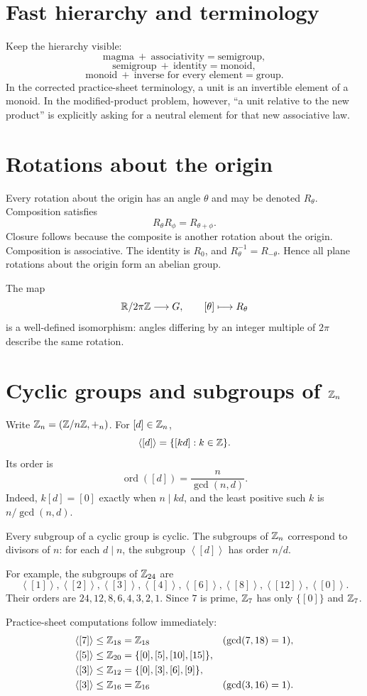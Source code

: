 \documentclass[11pt,openany]{book}
\newcommand{\angles}[1]{\left\langle#1\right\rangle}
\theoremstyle{definition}
\begin{document}
\section{Fast hierarchy and terminology}
Keep the hierarchy visible:
\[
\text{magma}\ +\ \text{associativity}=\text{semigroup},
\]
\[
\text{semigroup}\ +\ \text{identity}=\text{monoid},
\]
\[
\text{monoid}\ +\ \text{inverse for every element}=\text{group}.
\]
In the corrected practice-sheet terminology, a unit is an invertible element of a monoid. In the modified-product problem, however, ``a unit relative to the new product'' is explicitly asking for a neutral element for that new associative law.

\section{Rotations about the origin}
Every rotation about the origin has an angle $\theta$ and may be denoted $R_\theta$. Composition satisfies
\[
R_\theta R_\phi=R_{\theta+\phi}.
\]
Closure follows because the composite is another rotation about the origin. Composition is associative. The identity is $R_0$, and $R_\theta^{-1}=R_{-\theta}$. Hence all plane rotations about the origin form an abelian group.

The map
\[
\mathbb R/2\pi\mathbb Z\longrightarrow G,\qquad [\theta]\longmapsto R_\theta
\]
is a well-defined isomorphism: angles differing by an integer multiple of $2\pi$ describe the same rotation.

\section{Cyclic groups and subgroups of $\mathbb Z_n$}
Write $\mathbb Z_n=(\mathbb Z/n\mathbb Z,+_n)$. For $[d]\in\mathbb Z_n$,
\[
\angles{[d]}=\{[kd]:k\in\Z\}.
\]
Its order is
\[
\operatorname{ord}([d])=\frac{n}{\gcd(n,d)}. \tag{16.1}
\]
Indeed, $k[d]=[0]$ exactly when $n\mid kd$, and the least positive such $k$ is $n/\gcd(n,d)$.

Every subgroup of a cyclic group is cyclic. The subgroups of $\mathbb Z_n$ correspond to divisors of $n$: for each $d\mid n$, the subgroup $\angles{[d]}$ has order $n/d$.

For example, the subgroups of $\mathbb Z_{24}$ are
\[
\angles{[1]},\angles{[2]},\angles{[3]},\angles{[4]},
\angles{[6]},\angles{[8]},\angles{[12]},\angles{[0]}.
\]
Their orders are $24,12,8,6,4,3,2,1$. Since $7$ is prime, $\mathbb Z_7$ has only $\{[0]\}$ and $\mathbb Z_7$.

Practice-sheet computations follow immediately:
\begin{align*}
\angles{[7]}\le\Z_{18}&=\Z_{18} &&(\gcd(7,18)=1),\\
\angles{[5]}\le\Z_{20}&=\{[0],[5],[10],[15]\},\\
\angles{[3]}\le\Z_{12}&=\{[0],[3],[6],[9]\},\\
\angles{[3]}\le\Z_{16}&=\Z_{16} &&(\gcd(3,16)=1).
\end{align*}
\end{document}
